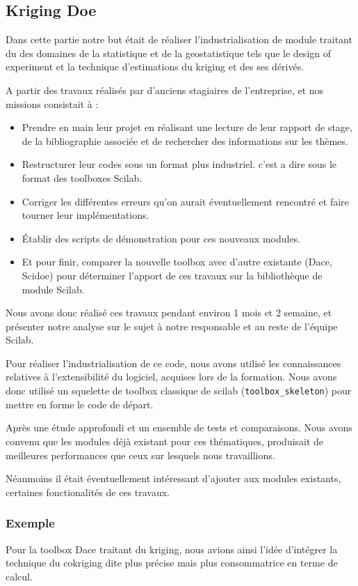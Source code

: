 \subsection*{Kriging Doe}

Dans cette partie notre but était de réaliser l’industrialisation
de module traitant du des domaines de la statistique et de la
geostatistique tels que le design of experiment et la technique
d’estimations du kriging et des ses dérivés.

A partir des travaux réalisés par d’anciens stagiaires de l’entreprise,
et nos missions consistait à :

\begin{itemize}
    \item Prendre en main leur projet en réalisant une lecture
        de leur rapport de stage, de la bibliographie associée
        et de rechercher des informations sur les thèmes.
    \item Restructurer leur codes sous un format plus industriel.
        c’est a dire sous le format des toolboxes Scilab.
    \item Corriger les différentes erreurs qu’on aurait
        éventuellement rencontré et faire tourner leur implémentations.
    \item Établir des scripts de démonstration pour ces nouveaux modules.
    \item Et pour finir, comparer la nouvelle toolbox avec d’autre
        existante (Dace, Scidoe) pour déterminer l’apport de ces
        travaux sur la bibliothèque de module Scilab.
\end{itemize}

Nous avons donc réalisé ces travaux pendant environ 1 mois et 2 semaine,
et présenter notre analyse sur le sujet à notre responsable
et au reste de l’équipe Scilab.

Pour réaliser l’industrialisation de ce code,
nous avons utilisé les connaissances relatives à
l’extensibilité du logiciel, acquises lors de la formation.
Nous avons donc utilisé un squelette de toolbox classique
de scilab ({\tt toolbox\_skeleton}) pour mettre en forme
le code de départ.

Après une étude approfondi et un ensemble de tests et comparaisons.
Nous avons convenu que les modules déjà existant pour ces thématiques,
produisait de meilleures performances que ceux sur lesquels nous travaillions.

Néanmoins il était éventuellement intéressant d’ajouter aux modules existants,
certaines fonctionalités de ces travaux.

\subsubsection*{Exemple}
Pour la toolbox Dace traitant du kriging, nous avions ainsi l’idée d'intégrer
la technique du cokriging dite plus précise mais plus consommatrice en terme de calcul.

